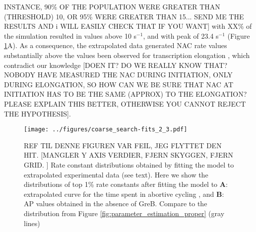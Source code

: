 INSTANCE, 90\% OF THE POPULATION WERE GREATER THAN (THRESHOLD) 10, OR 95\%
WERE GREATER THAN 15... SEND ME THE RESULTS AND i WILL EASILY CHECK THAT IF
YOU WANT] with XX\% of the simulation resulted in values above 10 s$^{-1}$,
and with peak of 23.4 s$^{-1}$ (Figure \ref{fig:extrap_and_GreB_minus_fit}A).
As a consequence, the extrapolated data generated  NAC rate values
substantially above the values been observed for transcription elongation
\cite{revyakin_abortive_2006}, which contradict our knowledge [DOEN IT? DO WE
REALLY KNOW THAT?  NOBODY HAVE MEASURED THE NAC DURING INITIATION, ONLY DURING
ELONGATION, SO HOW CAN WE BE SURE THAT NAC AT INITIATION HAS TO BE THE SAME
(APPROX) TO THE ELONGATION? PLEASE EXPLAIN THIS BETTER, OTHERWISE YOU CANNOT
REJECT THE HYPOTHESIS]. 


\begin{figure}
	\begin{center}
      \texttt{[image: ../figures/coarse\_search-fits\_2\_3.pdf]}
	\end{center}
    \caption{REF TIL DENNE FIGUREN VAR FEIL, JEG FLYTTET DEN HIT.  [MANGLER Y
        AXIS VERDIER, FJERN SKYGGEN, FJERN GRID. ] Rate constant distributions
        obtained by fitting the model to extrapolated experimental data (see
        text).  Here we show the distributions of top 1\% rate constants after
        fitting the model to \textbf{A}: extrapolated curve for the time spent
        in abortive cycling \cite{revyakin_abortive_2006}, and \textbf{B}:  AP
        values obtained in the absence of GreB. Compare to the distribution
    from Figure \ref{fig:parameter_estimation_proper} (gray lines)}
    \label{fig:extrap_and_GreB_minus_fit}
\end{figure}

